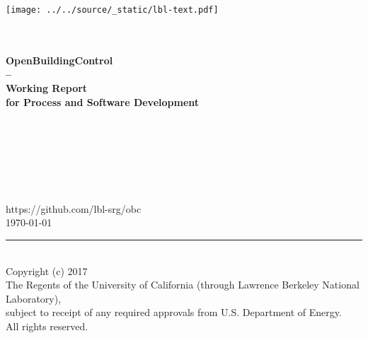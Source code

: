 \begin{titlepage}
\begin{minipage}{\headwidth}
\begin{flushright}
\texttt{[image: ../../source/\_static/lbl-text.pdf]}
\end{flushright}
\begin{flushright}
\vspace{-1cm}
\large{~}
\\[5mm]
\hrulefill
\\[5mm]
 \Large\sffamily\bfseries{OpenBuildingControl}\\
 \Large\sffamily\bfseries{--}\\[3mm]
 \Large\sffamily\bfseries{Working Report}\\
 \Large\sffamily\bfseries{for Process and Software Development}
\\
\hrulefill
~\\[30mm]
\end{flushright}
\begin{center}
\large{~}\\
\large{~}\\
\large{~}\\
\large{~}\\
\large{~}\\
\large{https://github.com/lbl-srg/obc}
~\\[30mm]
\large{\today}
\\[30mm]
\end{center}
\hrule
~\\[2mm]
Copyright (c) 2017\\
The Regents of the University of California
(through Lawrence Berkeley National Laboratory),\\
subject to receipt of any required approvals from U.S. Department of Energy.\\
All rights reserved.
\end{minipage}
\end{titlepage}

